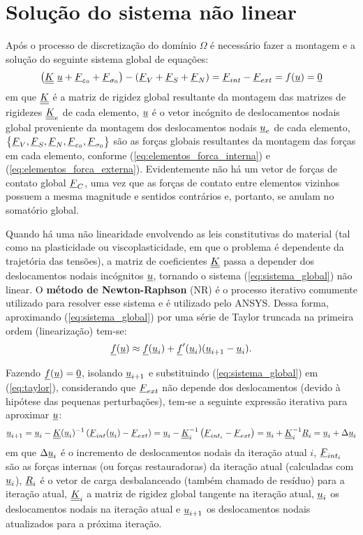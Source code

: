 \section{Solução do sistema não linear}
\label{cap: solução do sistema}

Após o processo de discretização do domínio $\Omega$ é necessário fazer a montagem e a solução do seguinte sistema global de equações:
\begin{equation}
	\label{eq:sistema_global}
	\left(\underline{\underline K}~\underline u + \underline{F}_{\varepsilon_{0}} + \underline{F}_{\sigma_{0}}\right) - \left(\underline{F}_V+\underline{F}_S+\underline{F}_N \right) = \underline{F}_{int} - \underline{F}_{ext} = f(\underline u) = \underline{0}  
\end{equation}
em que $\underline{\underline K}$ é a matriz de rigidez global resultante da montagem das matrizes de rigidezes $\underline{\underline K}_e$ de cada elemento, $\underline u$ é o vetor incógnito de deslocamentos nodais global proveniente da montagem dos deslocamentos nodais $\underline u_e$ de cada elemento, $\left\{\underline{F}_V,\underline{F}_S,\underline{F}_N,\underline{F}_{\varepsilon_0},\underline{F}_{\sigma_0} \right\}$ são as forças globais resultantes da montagem das forças em cada elemento, conforme (\ref{eq:elementos_forca_interna}) e (\ref{eq:elementos_forca_externa}). Evidentemente não há um vetor de forças de contato global $\underline{F}_C$, uma vez que as forças de contato entre elementos vizinhos possuem a mesma magnitude e sentidos contrários e, portanto, se anulam no somatório global.

Quando há uma não linearidade envolvendo as leis constitutivas do material (tal como na plasticidade ou viscoplasticidade, em que o problema é dependente da trajetória das tensões), a matriz de coeficientes $\underline{\underline K}$ passa a depender dos deslocamentos nodais incógnitos  $\underline u$, tornando o sistema (\ref{eq:sistema_global}) não linear. O \textbf{método de Newton-Raphson} (NR) é o processo iterativo comumente utilizado para resolver esse sistema e é utilizado pelo ANSYS. Dessa forma, aproximando (\ref{eq:sistema_global}) por uma série de Taylor truncada na primeira ordem (linearização) tem-se:
\begin{equation}
	\label{eq:taylor}
	\underline f(\underline u) \approx \underline f(\underline u_i) + \underline f'(\underline u_i)(\underline u_{i+1}-\underline u_i).
\end{equation}

Fazendo $\underline f(\underline u) = \underline{0}$, isolando $\underline u_{i+1}$ e substituindo (\ref{eq:sistema_global}) em (\ref{eq:taylor}), considerando que $\underline{F}_{ext}$ não depende dos deslocamentos (devido à hipótese das pequenas perturbações), tem-se a seguinte expressão iterativa para aproximar $\underline u$:
\begin{equation}
	\label{eq:NR}
	\underline u_{i+1} = \underline u_i - \underline{\underline K}(\underline u_i)^{-1}\left(\underline{F}_{int}(\underline u_i)-\underline{F}_{ext} \right) = \underline u_i - \underline{\underline K}_i^{-1} \left(\underline{F}_{int_i} - \underline{F}_{ext} \right) = \underline u_i + \underline{\underline K}_i^{-1}\underline{R}_i = \underline u_i + \Delta \underline u_i
\end{equation}
em que $\Delta \underline u_i$ é o incremento de deslocamentos nodais da iteração atual $i$, $\underline{F}_{int_i}$ são as forças internas (ou forças restauradoras) da iteração atual (calculadas com $\underline u_i$), $\underline{R}_i$ é o vetor de carga desbalanceado (também chamado de resíduo) para a iteração atual, $\underline{\underline K}_i$ a matriz de rigidez global tangente na iteração atual, $\underline u_i$ os deslocamentos nodais na iteração atual e $\underline u_{i+1}$ os deslocamentos nodais atualizados para a próxima iteração.

